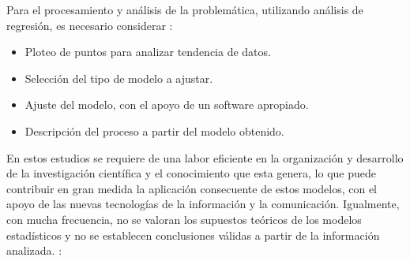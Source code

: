 Para el procesamiento y análisis de la problemática, utilizando análisis de regresión, es necesario considerar \parencite{fernandez2003biomodelos, rodriguez2018aplicaciones}:
\begin{itemize}
	\item Ploteo de puntos para analizar tendencia de datos.
	\item Selección del tipo de modelo a ajustar.
	\item Ajuste del modelo, con el apoyo de un software apropiado.
	\item Descripción del proceso a partir del modelo obtenido.
\end{itemize}

En estos estudios se requiere de una labor eficiente en la organización y desarrollo de la investigación científica y el conocimiento que esta genera, lo que puede contribuir en gran medida la aplicación consecuente de estos modelos, con el apoyo de las nuevas tecnologías de la información y la comunicación. Igualmente, con mucha frecuencia, no se valoran los supuestos teóricos de los modelos estadísticos y no se establecen conclusiones válidas a partir de la información analizada. \parencite{guerra2003criterios}:
